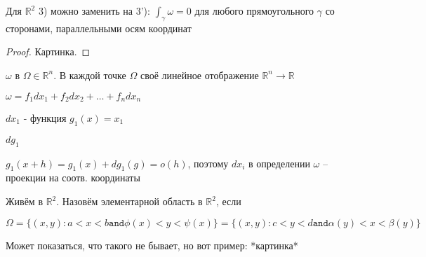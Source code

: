 \begin{remark}
    Для $\mathbb{R}^2$ 3) можно заменить на 3'): $\int_{\gamma}^{}\omega = 0$ для любого прямоугольного $\gamma$ со сторонами, параллельными осям координат
\end{remark}

\begin{proof}
    Картинка.
\end{proof}

\begin{remark}
    $\omega$ в $\Omega \in \mathbb{R}^n$. В каждой точке $\Omega$ своё линейное отображение $\mathbb{R}^n \to \mathbb{R}$

    $\omega = f_1dx_1 + f_2dx_2 + \dots + f_ndx_n$

    $dx_1$ - функция $g_1(x) = x_1$

    $dg_1$

    $g_1(x + h) = g_1(x) + dg_1(g) = o(h)$, поэтому $dx_i$ в определении $\omega$ -- проекции на соотв. координаты
\end{remark}

\begin{definition}
    Живём в $\mathbb{R}^2$. Назовём элементарной область в $\mathbb{R}^2$, если 

    $\Omega = \{ (x, y) : a < x < b \texttt{and} \phi(x) < y < \psi(x) \} = \{ (x, y): c < y < d \texttt{and} \alpha(y) < x < \beta(y) \}$

    Может показаться, что такого не бывает, но вот пример: *картинка*
\end{definition}

